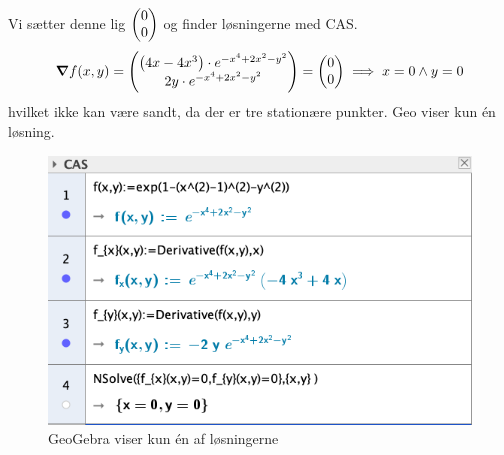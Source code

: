 \documentclass{article}
\begin{document}
Vi sætter denne lig $\mqty(0\\ 0) $ og finder løsningerne med CAS. 
\begin{equation*}
\begin{split}
  \grad f(x,y)= \mqty(\left(4x-4x^3\right) \cdot e^{-x^4+2x^2-y^2} \\ 2y \cdot e^{-x^4+2x^2-y^2} ) =\mqty(0\\ 0) \implies x=0 \land y=0
\end{split}
\end{equation*}
hvilket ikke kan være sandt, da der er tre stationære punkter.
Geo viser kun én løsning.
\begin{figure}[H]
\begin{center}
  \includegraphics[width=\textwidth]{CAS.png}
\end{center}
\caption{GeoGebra viser kun én af løsningerne}
\label{fig:CAS}
\end{figure}
\end{document}
